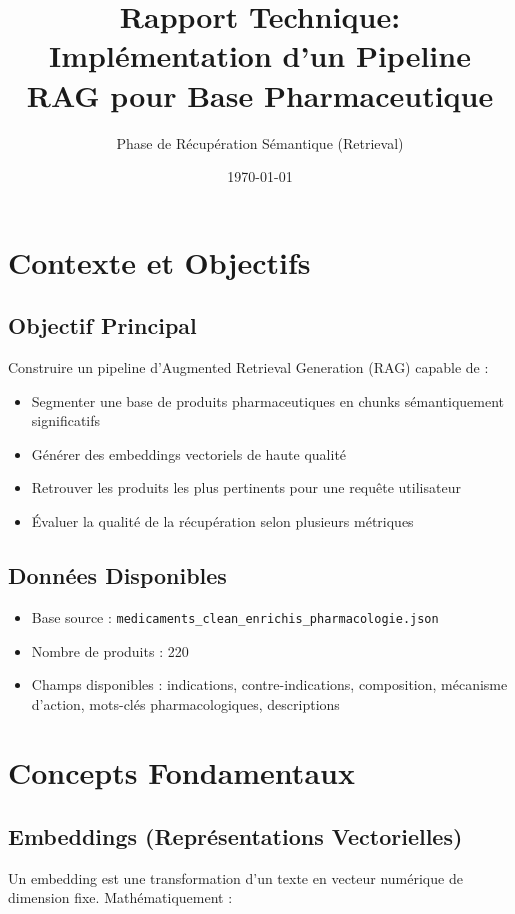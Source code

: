 \documentclass[12pt,a4paper]{article}
\title{Rapport Technique: Implémentation d'un Pipeline RAG pour Base Pharmaceutique}
\author{Phase de Récupération Sémantique (Retrieval)}
\date{\today}
\begin{document}
\maketitle

\tableofcontents
\newpage

\section{Contexte et Objectifs}

\subsection{Objectif Principal}
Construire un pipeline d'Augmented Retrieval Generation (RAG) capable de :
\begin{itemize}
    \item Segmenter une base de produits pharmaceutiques en chunks sémantiquement significatifs
    \item Générer des embeddings vectoriels de haute qualité
    \item Retrouver les produits les plus pertinents pour une requête utilisateur
    \item Évaluer la qualité de la récupération selon plusieurs métriques
\end{itemize}

\subsection{Données Disponibles}
\begin{itemize}
    \item Base source : \texttt{medicaments\_clean\_enrichis\_pharmacologie.json}
    \item Nombre de produits : 220
    \item Champs disponibles : indications, contre-indications, composition, mécanisme d'action, mots-clés pharmacologiques, descriptions
\end{itemize}

\section{Concepts Fondamentaux}

\subsection{Embeddings (Représentations Vectorielles)}
Un embedding est une transformation d'un texte en vecteur numérique de dimension fixe. Mathématiquement :
\end{document}

